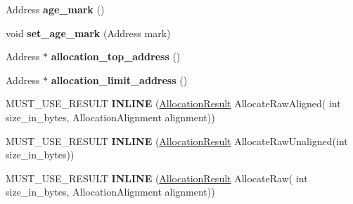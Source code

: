 \begin{DoxyCompactItemize}
\item 
Address {\bfseries age\+\_\+mark} ()\hypertarget{classv8_1_1internal_1_1_new_space_ac2db326d663e8f24e1e699d75a2373ad}{}\label{classv8_1_1internal_1_1_new_space_ac2db326d663e8f24e1e699d75a2373ad}

\item 
void {\bfseries set\+\_\+age\+\_\+mark} (Address mark)\hypertarget{classv8_1_1internal_1_1_new_space_a61f2c59fea2f6c0626fbae3d75aa4dd2}{}\label{classv8_1_1internal_1_1_new_space_a61f2c59fea2f6c0626fbae3d75aa4dd2}

\item 
Address $\ast$ {\bfseries allocation\+\_\+top\+\_\+address} ()\hypertarget{classv8_1_1internal_1_1_new_space_a76390e249756e491e6887b27718a31b6}{}\label{classv8_1_1internal_1_1_new_space_a76390e249756e491e6887b27718a31b6}

\item 
Address $\ast$ {\bfseries allocation\+\_\+limit\+\_\+address} ()\hypertarget{classv8_1_1internal_1_1_new_space_ab132e5fe993a4e1ade3bf1137dc655bb}{}\label{classv8_1_1internal_1_1_new_space_ab132e5fe993a4e1ade3bf1137dc655bb}

\item 
M\+U\+S\+T\+\_\+\+U\+S\+E\+\_\+\+R\+E\+S\+U\+LT {\bfseries I\+N\+L\+I\+NE} (\hyperlink{classv8_1_1internal_1_1_allocation_result}{Allocation\+Result} Allocate\+Raw\+Aligned(               int size\+\_\+in\+\_\+bytes, Allocation\+Alignment alignment))\hypertarget{classv8_1_1internal_1_1_new_space_ae8d64a20b918257a9cc6e10f653507ae}{}\label{classv8_1_1internal_1_1_new_space_ae8d64a20b918257a9cc6e10f653507ae}

\item 
M\+U\+S\+T\+\_\+\+U\+S\+E\+\_\+\+R\+E\+S\+U\+LT {\bfseries I\+N\+L\+I\+NE} (\hyperlink{classv8_1_1internal_1_1_allocation_result}{Allocation\+Result} Allocate\+Raw\+Unaligned(int size\+\_\+in\+\_\+bytes))\hypertarget{classv8_1_1internal_1_1_new_space_a763a3f1e954ed0607a8ca31a1f89901f}{}\label{classv8_1_1internal_1_1_new_space_a763a3f1e954ed0607a8ca31a1f89901f}

\item 
M\+U\+S\+T\+\_\+\+U\+S\+E\+\_\+\+R\+E\+S\+U\+LT {\bfseries I\+N\+L\+I\+NE} (\hyperlink{classv8_1_1internal_1_1_allocation_result}{Allocation\+Result} Allocate\+Raw(               int size\+\_\+in\+\_\+bytes, Allocation\+Alignment alignment))\hypertarget{classv8_1_1internal_1_1_new_space_a9d2180d7cb8059778839cb3b040dcc4f}{}\label{classv8_1_1internal_1_1_new_space_a9d2180d7cb8059778839cb3b040dcc4f}


\end{DoxyCompactItemize}
